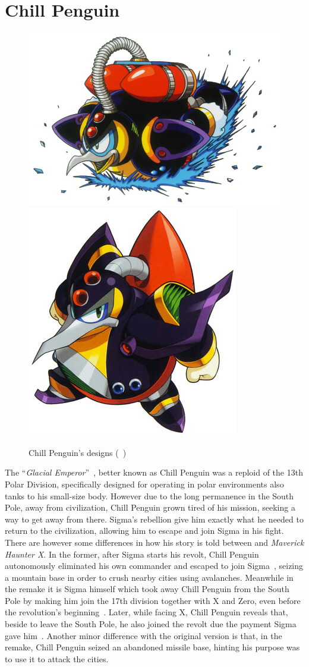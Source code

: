 \section{Chill Penguin}\label{boss:Chill_Penguin}
\begin{figure}[htp]
	\centering
	\includegraphics[width=0.5\linewidth]{figures/X1/Chill_penguin/Chill_Penguin.jpg}
	\includegraphics[width=0.4\linewidth]{figures/X1/Chill_penguin/MHXChillPenguin.jpg}
	\caption{Chill Penguin's designs (~\cite{book:MMX_Complete_art})}
\end{figure}

The ``\textit{Glacial Emperor}''~\cite{book:MMX_Complete_art}, better known as Chill Penguin was a reploid of the 13th Polar Division, specifically designed for operating in polar environments also tanks to his small-size body. However due to the long permanence in the South Pole, away from civilization, Chill Penguin grown tired of his mission, seeking a way to get away from there. Sigma's rebellion give him exactly what he needed to return to the civilization, allowing him to escape and join Sigma in his fight. There are however some differences in how his story is told between \x and \textit{Maverick Haunter X}. In the former, after Sigma starts his revolt, Chill Penguin autonomously eliminated his own commander and escaped to join Sigma~\cite{Xcoll1:Manual_X1}, seizing a mountain base in order to crush nearby cities using avalanches. Meanwhile in the remake it is Sigma himself which took away Chill Penguin from the South Pole by making him join the 17th division together with X and Zero, even before the revolution's beginning~\cite{MHX:manual}. Later, while facing X, Chill Penguin reveals that, beside to leave the South Pole, he also joined the revolt due the payment Sigma gave him~\cite{wiki:MMX_script}. Another minor difference with the original version is that, in the remake, Chill Penguin seized an abandoned missile base, hinting his purpose was to use it to attack the cities. 

